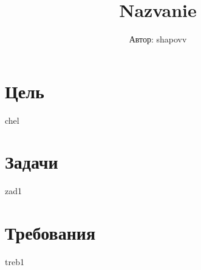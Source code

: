 \documentclass{article}%
\title{Nazvanie}%
\author{Автор: shapovv}%
\date{}%
\begin{document}
%
\normalsize%
\maketitle%
\section{Цель}%
\label{sec:goal}%
chel

%
\section{Задачи}%
\label{sec:tasks}%
zad1\newline%

%
\section{Требования}%
\label{sec:requirements}%
treb1\newline%

%
\end{document}
